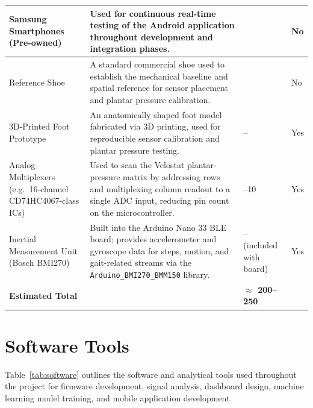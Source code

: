 \begin{longtable}{|>{\raggedright\arraybackslash}p{2.85cm}|>{\raggedright\arraybackslash}p{8.55cm}|>{\raggedright\arraybackslash}p{1.95cm}|>{\centering\arraybackslash}p{1.25cm}|}
Samsung Smartphones (Pre-owned) & Used for continuous real-time testing of the Android application throughout development and integration phases. & 0 & No \\ \hline
Reference Shoe & A standard commercial shoe used to establish the mechanical baseline and spatial reference for sensor placement and plantar pressure calibration. & 33 & No \\ \hline
3D-Printed Foot Prototype & An anatomically shaped foot model fabricated via 3D printing, used for reproducible sensor calibration and plantar pressure testing. & -- & Yes \\ \hline
Analog Multiplexers (e.g.\ 16-channel CD74HC4067-class ICs) & Used to scan the Velostat plantar-pressure matrix by addressing rows and multiplexing column readout to a single ADC input, reducing pin count on the microcontroller. & 4--10 & Yes \\ \hline
Inertial Measurement Unit (Bosch BMI270) & Built into the Arduino Nano 33 BLE board; provides accelerometer and gyroscope data for steps, motion, and gait-related streams via the \texttt{Arduino\_BMI270\_BMM150} library. & -- (included with board) & Yes \\ \hline
\textbf{Estimated Total} & & \textbf{$\approx$ 200--250} & \\
\hline
\end{longtable}
\endgroup
\vspace{2pt}

\section{Software Tools}

Table~\ref{tab:software} outlines the software and analytical tools used throughout the project for firmware development, signal analysis, dashboard design, machine learning model training, and mobile application development.

